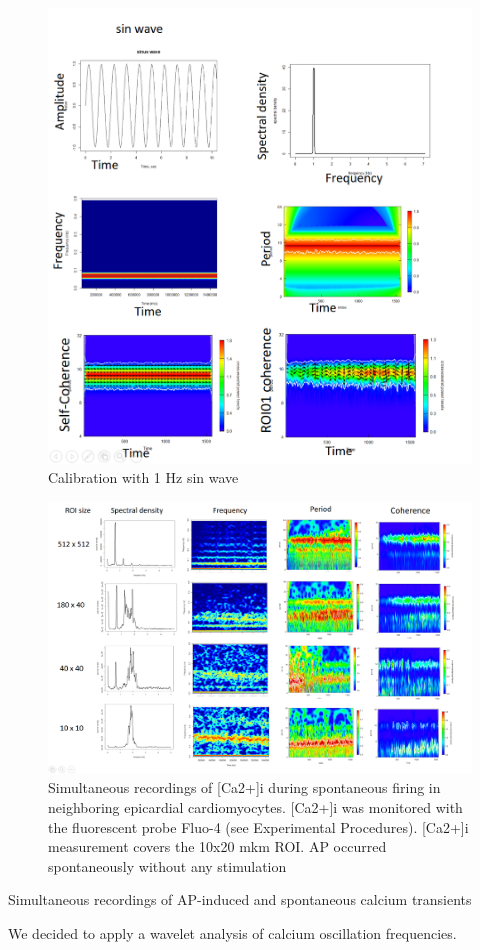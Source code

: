 \documentclass{biophys-new}
\begin{document}
\begin{figure}[hbt!]
\centering
\includegraphics[width=0.6\linewidth]{fig6.png}
\caption{Calibration with 1 Hz sin wave}
\label{fig:fig6}
\end{figure}



\begin{figure}[hbt!]
\centering
\includegraphics[width=0.9\linewidth]{fig7.png}
\caption{Simultaneous recordings of [Ca2+]i during spontaneous firing in neighboring epicardial cardiomyocytes. [Ca2+]i was monitored with the fluorescent probe Fluo-4 (see Experimental Procedures). [Ca2+]i measurement covers the 10x20 mkm ROI. AP occurred spontaneously without any stimulation}
\label{fig:fig7}
\end{figure}


Simultaneous recordings of AP-induced and spontaneous calcium transients


We decided to apply a wavelet analysis of calcium oscillation frequencies. \cite{addison2018introduction}
\end{document}
